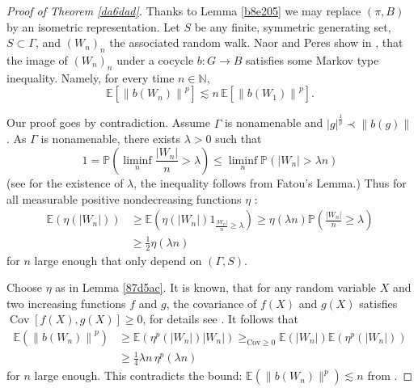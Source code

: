 \documentclass[12pt]{amsart}
\theoremstyle{definition}
\begin{document}
\begin{proof}[Proof of Theorem \ref{da6dad}]
Thanks to Lemma \ref{b8e205} we may replace \((\pi,B)\) by an isometric
representation. Let \(S\) be any finite, symmetric generating set,
\(S \subset \Gamma\), and \(\left(W_n\right)_n\) the associated random
walk. Naor and Peres show in \cite[Theorem~2.1]{Naor2008}, that the
image of \(\left(W_n\right)_n\) under a cocycle \(b: G \to B\) satisfies
some Markov type inequality. Namely, for every time
\(n \in \mathbb{N}\),
\[\mathbb{E}\left[\left\|b\left(W_{n}\right)\right\|^{p}\right] \lesssim  n \,  \mathbb{E}\left[\left\|b\left(W_{1}\right)\right\|^{p}\right].\]

Our proof goes by contradiction. Assume \(\Gamma\) is nonamenable and
\(|g|^{\frac{1}{p}} \prec \|b(g)\|\). As \(\Gamma\) is nonamenable,
there exists \(\lambda>0\) such that \[
1=\mathbb{P}\left(\liminf _n \frac{\left|W_n\right|}{n}>\lambda\right) \leq \liminf _n \mathbb{P}\left(\left|W_n\right|>\lambda n\right)
\] (see \cite[Proposition~8.2]{Woess2000} for the existence of
\(\lambda\), the inequality follows from Fatou's Lemma.) Thus for all
measurable positive nondecreasing functions \(\eta\) : \[
\begin{aligned}
\mathbb{E}\left(\eta\left(\left|W_n\right|\right)\right) & \geq \mathbb{E}\left(\eta\left(\left|W_n\right|\right) 1_{\frac{\left|W_n\right|}{n} \geq \lambda}\right) \geq \eta(\lambda n) \mathbb{P}\left(\frac{\left|W_n\right|}{n} \geq \lambda\right) \\
& \geq \frac{1}{2} \eta(\lambda n)
\end{aligned}
\] for \(n\) large enough that only depend on \((\Gamma, S)\).

Choose \(\eta\) as in Lemma \ref{87d5ac}. It is known, that for any
random variable \(X\) and two increasing functions \(f\) and \(g\), the
covariance of \(f(X)\) and \(g(X)\) satisfies
\(\operatorname{Cov}[f(X), g(X)] \geq 0\), for details see
\cite{Schmidt2014}. It follows that \[
\begin{aligned}
\mathbb{E}\left(\left\|b\left(W_n\right)\right\|^p\right) & \geq \mathbb{E}\left(\eta^p\left(\left|W_n\right|\right)\left|W_n\right|\right) \geq_{\mathrm{Cov} \geq 0} \mathbb{E}\left(\left|W_n\right|\right) \mathbb{E}\left(\eta^p\left(\left|W_n\right|\right)\right) \\
& \geq \frac{1}{4} \lambda n \,\eta^p(\lambda n)
\end{aligned}
\] for \(n\) large enough. This contradicts the bound:
\(\mathbb{E}\left(\|b(W_{n})\|^p\right) \lesssim n\) from
\cite[Theorem~2.1]{Naor2008}.

\end{proof}
\end{document}

